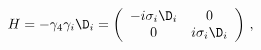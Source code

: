 \begin{equation}
H = - \gamma_4 \gamma_i \D_i = \left( \begin{array}{cc}
                - i \sigma_i \D_i & 0 \\
                0 & i \sigma_i \D_i
                \end{array} \right) \, ,
\end{equation}

